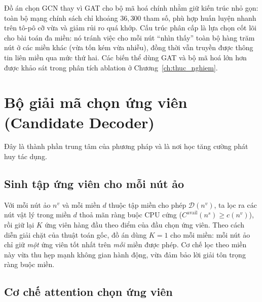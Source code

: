 \documentclass[../DoAn.tex]{subfiles}
\begin{document}
Đồ án chọn GCN thay vì GAT cho bộ mã hoá chính nhằm giữ kiến trúc nhỏ gọn: toàn bộ mạng chính sách chỉ khoảng $36{,}300$ tham số, phù hợp huấn luyện nhanh trên tô-pô cỡ vừa và giảm rủi ro quá khớp. Cấu trúc phân cấp là lựa chọn cốt lõi cho bài toán đa miền: nó tránh việc cho mỗi nút ``nhìn thấy'' toàn bộ hàng trăm nút ở các miền khác (vừa tốn kém vừa nhiễu), đồng thời vẫn truyền được thông tin liên miền qua mức thứ hai. Các biến thể dùng GAT và bộ mã hoá lớn hơn được khảo sát trong phân tích ablation ở Chương~\ref{ch:thuc_nghiem}.

\section{Bộ giải mã chọn ứng viên (Candidate Decoder)} %
\label{sec:decoder}

Đây là thành phần trung tâm của phương pháp và là nơi học tăng cường phát huy tác dụng.

\subsection{Sinh tập ứng viên cho mỗi nút ảo}
\label{subsec:cand-gen}

Với mỗi nút ảo $n^v$ và mỗi miền $d$ thuộc tập miền cho phép $\mathcal{D}(n^v)$, ta lọc ra các nút vật lý trong miền $d$ thoả mãn ràng buộc CPU cứng ($C^{\text{avail}}(n^s) \ge c(n^v)$), rồi giữ lại $K$ ứng viên hàng đầu theo điểm của đầu chọn ứng viên. Theo cách diễn giải chặt của thuật toán gốc, đồ án dùng $K=1$ cho mỗi miền: mỗi nút ảo chỉ giữ \textit{một} ứng viên tốt nhất trên \textit{mỗi} miền được phép. Cơ chế lọc theo miền này vừa thu hẹp mạnh không gian hành động, vừa đảm bảo lời giải tôn trọng ràng buộc miền.

\subsection{Cơ chế attention chọn ứng viên}
\label{subsec:cand-attn}
\end{document}
